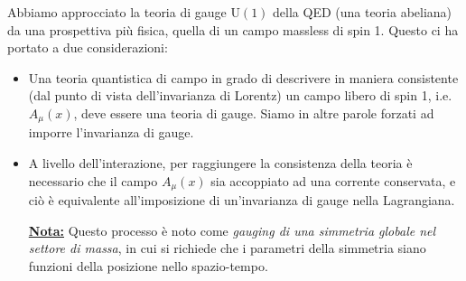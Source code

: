 \documentclass[../main.tex]{subfiles}
\begin{document}
Abbiamo approcciato la teoria di gauge $\textrm{U}(1)$ della QED (una teoria abeliana) da una prospettiva più fisica, quella di un campo massless di spin 1. Questo ci ha portato a due considerazioni:
\begin{itemize}
    \item Una teoria quantistica di campo in grado di descrivere in maniera consistente (dal punto di vista dell'invarianza di Lorentz) un campo libero di spin 1, i.e. $A_\mu(x)$, deve essere una teoria di gauge. Siamo in altre parole forzati ad imporre l'invarianza di gauge.
    
    \item A livello dell'interazione, per raggiungere la consistenza della teoria è necessario che il campo $A_\mu(x)$ sia accoppiato ad una corrente conservata, e ciò è equivalente all'imposizione di un'invarianza di gauge nella Lagrangiana. 
    
    \textbf{\underline{Nota:}} Questo processo è noto come \textit{gauging di una simmetria globale nel settore di massa}, in cui si richiede che i parametri della simmetria siano funzioni della posizione nello spazio-tempo.
\end{itemize}
\end{document}

